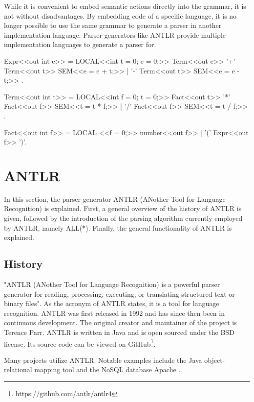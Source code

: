 While it is convenient to embed semantic actions directly into the grammar, it is not without disadvantages. By embedding code of a specific language, it is no longer possible to use the same grammar to generate a parser in another implementation language. Parser generators like ANTLR provide multiple implementation languages to generate a parser for. 

\begin{GenericCode}[float,numbers=none,caption=Attributed Grammar for Coco-2 for simple arithmetic expressions., label=lst:Coco2ATG]
Expr<<out int e>> =      LOCAL<<int t = 0; e = 0;>>
  Term<<out e>>             
  { '+' Term<<out t>>    SEM<<e = e + t;>>
  | '-' Term<<out t>>    SEM<<e = e - t;>>
  }.

Term<<out int t>> =      LOCAL<<int f = 0; t = 0;>>
  Fact<<out t>>
  { '*' Fact<<out f>>    SEM<<t = t * f;>>
  | '/' Fact<<out f>>    SEM<<t = t / f;>>
  }.
  
Fact<<out int f>> =      LOCAL <<f = 0;>>
    number<<out f>>
  | '(' Expr<<out f>> ')'.

\end{GenericCode}

\section{ANTLR}

In this section, the parser generator ANTLR (ANother Tool for Language Recognition) is explained. First, a general overview of the history of ANTLR is given, followed by the introduction of the parsing algorithm currently employed by ANTLR, namely ALL(*). Finally, the general functionality of ANTLR is explained.  

\subsection{History}

"ANTLR (ANother Tool for Language Recognition) is a powerful parser generator for reading, processing, executing, or translating structured text or binary files". As the acronym of ANTLR states, it is a tool for language recognition. ANTLR was first released in 1992 and has since then been in continuous development. The original creator and maintainer of the project is Terence Parr. ANTLR is written in Java and is open sourced under the BSD license. Its source code can be viewed on GitHub\footnote{https://github.com/antlr/antlr4}. 

Many projects utilize ANTLR. Notable examples include the Java object-relational mapping tool \cite{HibernateWeb2024} and the NoSQL database Apache \textcite{Cassandra2024}.

